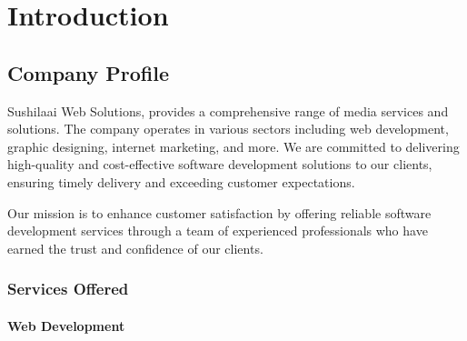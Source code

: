 \chapter{Introduction}



\section{Company Profile}

Sushilaai Web Solutions, provides a comprehensive range of media services and solutions. The company operates in various sectors including web development, graphic designing, internet marketing, and more. We are committed to delivering high-quality and cost-effective software development solutions to our clients, ensuring timely delivery and exceeding customer expectations.

Our mission is to enhance customer satisfaction by offering reliable software development services through a team of experienced professionals who have earned the trust and confidence of our clients.



\subsection{ Services Offered }






\subsubsection{Web Development }

